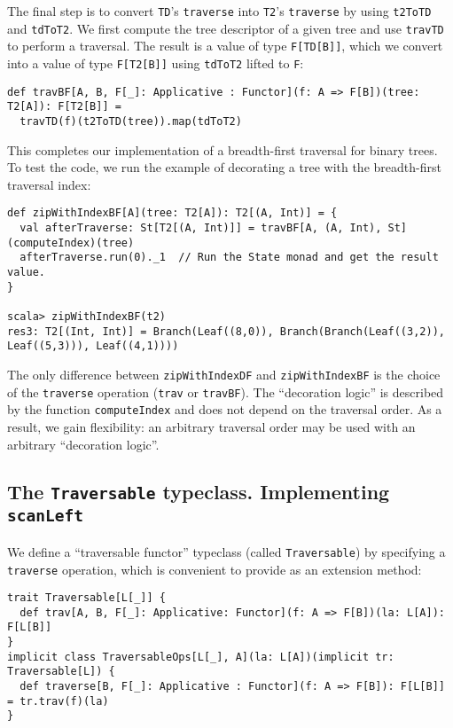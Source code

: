 The final step is to convert \lstinline!TD!\textsf{'}s \lstinline!traverse!
into \lstinline!T2!\textsf{'}s \lstinline!traverse! by using \lstinline!t2ToTD!
and \lstinline!tdToT2!. We first compute the tree descriptor of a
given tree and use \lstinline!travTD! to perform a traversal. The
result is a value of type \lstinline!F[TD[B]]!, which we convert
into a value of type \lstinline!F[T2[B]]! using \lstinline!tdToT2!
lifted to \lstinline!F!:
\begin{lstlisting}
def travBF[A, B, F[_]: Applicative : Functor](f: A => F[B])(tree: T2[A]): F[T2[B]] =
  travTD(f)(t2ToTD(tree)).map(tdToT2) 
\end{lstlisting}

This completes our implementation of a breadth-first traversal for
binary trees. To test the code, we run the example of decorating a
tree with the breadth-first traversal index:
\begin{lstlisting}
def zipWithIndexBF[A](tree: T2[A]): T2[(A, Int)] = {
  val afterTraverse: St[T2[(A, Int)]] = travBF[A, (A, Int), St](computeIndex)(tree)
  afterTraverse.run(0)._1  // Run the State monad and get the result value.
}

scala> zipWithIndexBF(t2)
res3: T2[(Int, Int)] = Branch(Leaf((8,0)), Branch(Branch(Leaf((3,2)), Leaf((5,3))), Leaf((4,1))))
\end{lstlisting}

The only difference between \lstinline!zipWithIndexDF! and \lstinline!zipWithIndexBF!
is the choice of the \lstinline!traverse! operation (\lstinline!trav!
or \lstinline!travBF!). The \textsf{``}decoration logic\textsf{''} is described by
the function \lstinline!computeIndex! and does not depend on the
traversal order. As a result, we gain flexibility: an arbitrary traversal
order may be used with an arbitrary \textsf{``}decoration logic\textsf{''}. 

\subsection{The \texttt{Traversable} typeclass. Implementing \texttt{scanLeft}}

We define a \textsf{``}traversable functor\textsf{''} typeclass (called \lstinline!Traversable!)
by specifying a \lstinline!traverse! operation, which is convenient
to provide as an extension method:
\begin{lstlisting}
trait Traversable[L[_]] {
  def trav[A, B, F[_]: Applicative: Functor](f: A => F[B])(la: L[A]): F[L[B]]
}
implicit class TraversableOps[L[_], A](la: L[A])(implicit tr: Traversable[L]) {
  def traverse[B, F[_]: Applicative : Functor](f: A => F[B]): F[L[B]] = tr.trav(f)(la)
}
\end{lstlisting}


